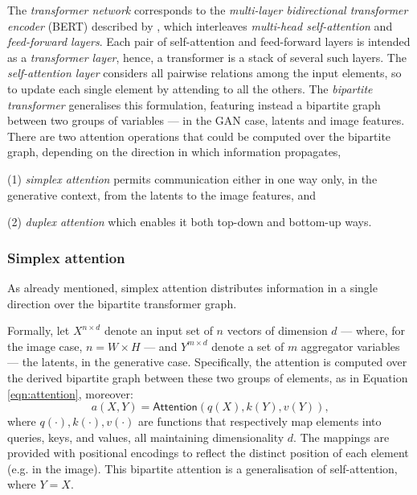 \documentclass{article}
\begin{document}
	The \textit{transformer network} corresponds to the \textit{multi-layer bidirectional transformer 
	encoder} (BERT) described by \citet{devlin2019bert}, which interleaves \textit{multi-head 
	self-attention} and \textit{feed-forward layers}.
	Each pair of self-attention and feed-forward layers is intended as a \textit{transformer layer}, hence, 
	a transformer is a stack of several such layers. 
	The \textit{self-attention layer} considers all pairwise relations among the input elements, so to 
	update each single element by attending to all the others. 
	The \textit{bipartite transformer} generalises this formulation, featuring instead a bipartite graph 
	between two groups of variables — in the GAN case, latents and image features. 
	There are two attention operations that could be computed over the bipartite graph, depending on 
	the direction in which information propagates, 
	\begin{enumerate*}
		\item [(1)] \textit{simplex attention} permits communication either in one way only, in the 
		generative context, from the latents to the image features, and
		\item [(2)] \textit{duplex attention} which enables it both top-down and bottom-up ways.
	\end{enumerate*}
	
	\subsubsection{Simplex attention}%
	As already mentioned, simplex attention distributes information in a single direction over the 
	bipartite transformer graph. 
	
	Formally, let $X^{n\times d}$ denote an input set of $n$ vectors of dimension $d$ — where, for the 
	image case, $n = W\times H$ — and $Y^{m\times d}$ denote a set of $m$ aggregator variables — 
	the latents, in the generative case. Specifically, the attention is computed over the derived bipartite 
	graph between these two groups of elements, as in Equation \eqref{eqn:attention}, moreover:
	\begin{equation}
		\label{eqn:attention2}
		a(X,Y)=\mathsf{Attention}(q(X), k(Y), v(Y)) \mbox{,}
	\end{equation}
	where $q(\cdot), k(\cdot), v(\cdot)$ are functions that respectively map elements into queries, 
	keys, and values, all maintaining dimensionality $d$. 
	The mappings are provided with positional encodings to reflect the distinct position of each element 
	(e.g. in the image). This bipartite attention is a generalisation of self-attention, where $Y = X$.
	
\end{document}
